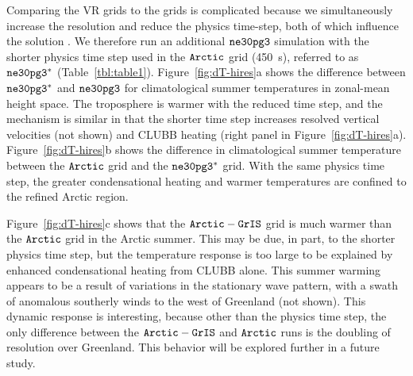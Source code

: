 \documentclass[draft]{agujournal2019}
\begin{document}
Comparing the VR grids to the {\color{blue}{lat-lon and quasi-uniform}} grids is complicated because we simultaneously increase the resolution and reduce the physics time-step, both of which influence the solution \cite{W2008TELLUS}. We therefore run an additional $\tt ne30pg3$ simulation with the shorter physics time step used in the $\tt Arctic$ grid (450~s), referred to as $\tt ne30pg3^{*}$ (Table~\ref{tbl:table1}). Figure~\ref{fig:dT-hires}a shows the difference between $\tt ne30pg3^{*}$ and $\tt ne30pg3$ for climatological summer temperatures in zonal-mean height space. The troposphere is warmer with the reduced time step, and the mechanism is similar in that the shorter time step increases resolved vertical velocities (not shown) and CLUBB heating (right panel in Figure~\ref{fig:dT-hires}a). Figure~\ref{fig:dT-hires}b shows the difference in climatological summer temperature between the $\tt Arctic$ grid and the $\tt ne30pg3^{*}$ grid.  With the same physics time step, the greater condensational heating and warmer temperatures are confined to the refined Arctic region.

Figure~\ref{fig:dT-hires}c shows that the $\tt Arctic-GrIS$ grid is much warmer than the $\tt Arctic$ grid in the Arctic summer. This may be due, in part, to the shorter physics time step, but the temperature response is too large to be explained by enhanced condensational heating from CLUBB alone. This summer warming appears to be a result of variations in the stationary wave pattern, with a swath of anomalous southerly winds to the west of Greenland (not shown). This dynamic response is interesting, because other than the physics time step, the only difference between the $\tt Arctic-GrIS$ and $\tt Arctic$ runs is the doubling of resolution over Greenland. This behavior will be explored further in a future study.
\end{document}
